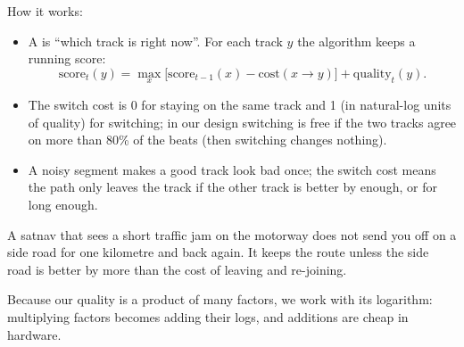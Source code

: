 \documentclass[11pt]{article}
\begin{document}
\begin{center}
\end{center}

How it works:
\begin{itemize}
  \item A  is ``which track is right now''. For each track $y$ the algorithm keeps a running score:
  \[
  \text{score}_t(y) = \max_x\big[\text{score}_{t-1}(x) - \text{cost}(x \to y)\big] + \text{quality}_t(y).
  \]
  \item The switch cost is 0 for staying on the same track and 1 (in natural-log units of quality) for switching; in our design switching is free if the two tracks agree on more than 80\% of the beats (then switching changes nothing).
  \item A noisy segment makes a good track look bad once; the switch cost means the path only leaves the track if the other track is better by enough, or for long enough.
\end{itemize}

\begin{analogy}
A satnav that sees a short traffic jam on the motorway does not send you off on a side road for one kilometre and back again. It keeps the route unless the side road is better by more than the cost of leaving and re-joining.
\end{analogy}

Because our quality is a product of many factors, we work with its logarithm: multiplying factors becomes adding their logs, and additions are cheap in hardware.
\end{document}
